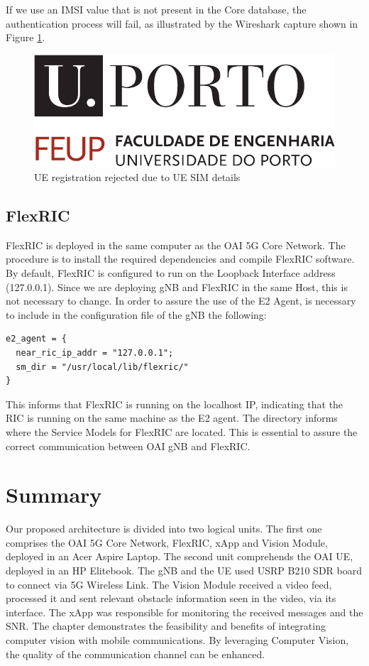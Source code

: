 If we use an IMSI value that is not present in the Core database, the authentication process will fail, as illustrated by the Wireshark capture shown in Figure \ref{fig:UE_failure}.

\begin{figure}[H]
    \centering
    \includegraphics[width=0.7\linewidth]{figures/uporto-feup}
    \caption{UE registration rejected due to UE SIM details}
    \label{fig:UE_failure}
\end{figure}

\subsection{FlexRIC}\label{subsec:flexric}
FlexRIC is deployed in the same computer as the OAI 5G Core Network.
The procedure is to install the required dependencies and compile FlexRIC software.
By default, FlexRIC is configured to run on the Loopback Interface address (127.0.0.1).
Since we are deploying gNB and FlexRIC in the same Host, this is not necessary to change.
In order to assure the use of the E2 Agent, is necessary to include in the configuration file of the gNB the following:

\begin{verbatim}
e2_agent = {
  near_ric_ip_addr = "127.0.0.1";
  sm_dir = "/usr/local/lib/flexric/"
}
\end{verbatim}

This informs that FlexRIC is running on the localhost IP, indicating that the RIC is running on the same machine as the E2 agent.
The directory informs where the Service Models for FlexRIC are located.
This is essential to assure the correct communication between OAI gNB and FlexRIC\@.



\section{Summary}\label{sec:summary}
Our proposed architecture is divided into two logical units.
The first one comprises the OAI 5G Core Network, FlexRIC, xApp and Vision Module, deployed in an Acer Aspire Laptop.
The second unit comprehends the OAI UE, deployed in an HP Elitebook.
The gNB and the UE used USRP B210 SDR board to connect via 5G Wireless Link.
The Vision Module received a video feed, processed it and sent relevant obstacle information seen in the video, via its interface.
The xApp was responsible for monitoring the received messages and the SNR.
The chapter demonstrates the feasibility and benefits of integrating computer vision with mobile communications.
By leveraging Computer Vision, the quality of the communication channel can be enhanced.






